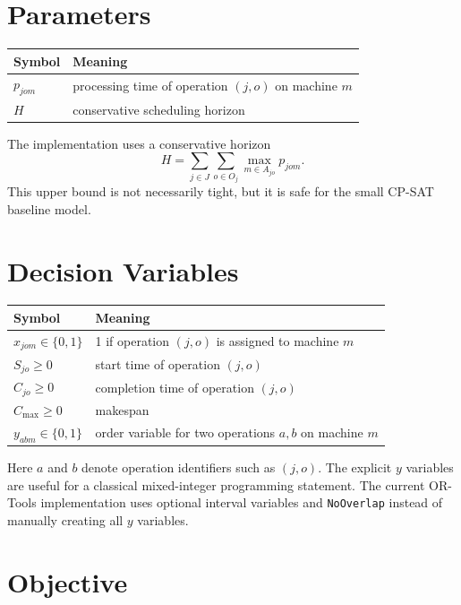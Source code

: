 ﻿\documentclass[11pt]{article}
\begin{document}
\section{Parameters}

\begin{table}[h]
\centering
\begin{tabular}{ll}
\toprule
Symbol & Meaning \\
\midrule
$p_{jom}$ & processing time of operation $(j,o)$ on machine $m$ \\
$H$ & conservative scheduling horizon \\
\bottomrule
\end{tabular}
\end{table}

The implementation uses a conservative horizon
\[
H = \sum_{j \in J} \sum_{o \in O_j} \max_{m \in A_{jo}} p_{jom}.
\]
This upper bound is not necessarily tight, but it is safe for the small
CP-SAT baseline model.

\section{Decision Variables}

\begin{table}[h]
\centering
\begin{tabular}{ll}
\toprule
Symbol & Meaning \\
\midrule
$x_{jom} \in \{0,1\}$ & 1 if operation $(j,o)$ is assigned to machine $m$ \\
$S_{jo} \ge 0$ & start time of operation $(j,o)$ \\
$C_{jo} \ge 0$ & completion time of operation $(j,o)$ \\
$C_{\max} \ge 0$ & makespan \\
$y_{abm} \in \{0,1\}$ & order variable for two operations $a,b$ on machine $m$ \\
\bottomrule
\end{tabular}
\end{table}

Here $a$ and $b$ denote operation identifiers such as $(j,o)$. The explicit
$y$ variables are useful for a classical mixed-integer programming statement.
The current OR-Tools implementation uses optional interval variables and
\texttt{NoOverlap} instead of manually creating all $y$ variables.

\section{Objective}
\end{document}
